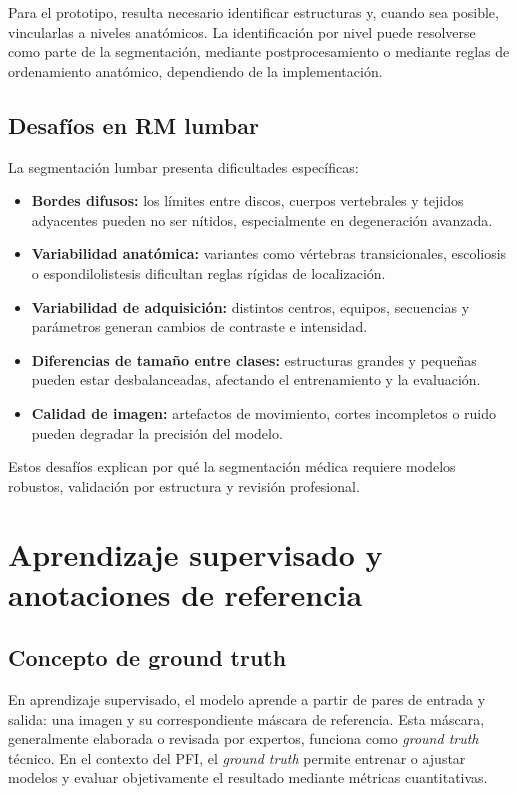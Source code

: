 Para el prototipo, resulta necesario identificar estructuras y, cuando sea posible, vincularlas a niveles anatómicos. La identificación por nivel puede resolverse como parte de la segmentación, mediante postprocesamiento o mediante reglas de ordenamiento anatómico, dependiendo de la implementación.

\subsection{Desafíos en RM lumbar}

La segmentación lumbar presenta dificultades específicas:

\begin{itemize}
    \item \textbf{Bordes difusos:} los límites entre discos, cuerpos vertebrales y tejidos adyacentes pueden no ser nítidos, especialmente en degeneración avanzada.
    \item \textbf{Variabilidad anatómica:} variantes como vértebras transicionales, escoliosis o espondilolistesis dificultan reglas rígidas de localización.
    \item \textbf{Variabilidad de adquisición:} distintos centros, equipos, secuencias y parámetros generan cambios de contraste e intensidad.
    \item \textbf{Diferencias de tamaño entre clases:} estructuras grandes y pequeñas pueden estar desbalanceadas, afectando el entrenamiento y la evaluación.
    \item \textbf{Calidad de imagen:} artefactos de movimiento, cortes incompletos o ruido pueden degradar la precisión del modelo.
\end{itemize}

Estos desafíos explican por qué la segmentación médica requiere modelos robustos, validación por estructura y revisión profesional.

\section{Aprendizaje supervisado y anotaciones de referencia}

\subsection{Concepto de ground truth}

En aprendizaje supervisado, el modelo aprende a partir de pares de entrada y salida: una imagen y su correspondiente máscara de referencia. Esta máscara, generalmente elaborada o revisada por expertos, funciona como \textit{ground truth} técnico. En el contexto del PFI, el \textit{ground truth} permite entrenar o ajustar modelos y evaluar objetivamente el resultado mediante métricas cuantitativas.

